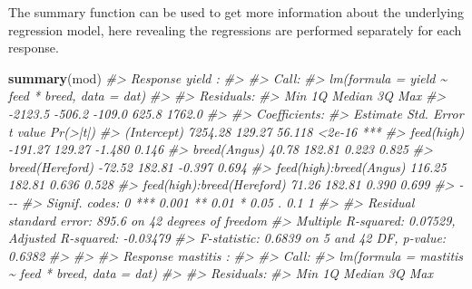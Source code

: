 \documentclass[
]{article}
\newenvironment{Shaded}{\begin{snugshade}}{\end{snugshade}}
\newcommand{\CommentTok}[1]{\textcolor[rgb]{0.56,0.35,0.01}{\textit{#1}}}
\newcommand{\FunctionTok}[1]{\textcolor[rgb]{0.13,0.29,0.53}{\textbf{#1}}}
\newcommand{\NormalTok}[1]{#1}
\begin{document}
The summary function can be used to get more information about the
underlying regression model, here revealing the regressions are
performed separately for each response.

\begin{Shaded}
\begin{Highlighting}[]
\FunctionTok{summary}\NormalTok{(mod)}
\CommentTok{\#\textgreater{} Response yield :}
\CommentTok{\#\textgreater{} }
\CommentTok{\#\textgreater{} Call:}
\CommentTok{\#\textgreater{} lm(formula = yield \textasciitilde{} feed * breed, data = dat)}
\CommentTok{\#\textgreater{} }
\CommentTok{\#\textgreater{} Residuals:}
\CommentTok{\#\textgreater{}     Min      1Q  Median      3Q     Max }
\CommentTok{\#\textgreater{} {-}2123.5  {-}506.2  {-}109.0   625.8  1762.0 }
\CommentTok{\#\textgreater{} }
\CommentTok{\#\textgreater{} Coefficients:}
\CommentTok{\#\textgreater{}                            Estimate Std. Error t value Pr(\textgreater{}|t|)    }
\CommentTok{\#\textgreater{} (Intercept)                 7254.28     129.27  56.118   \textless{}2e{-}16 ***}
\CommentTok{\#\textgreater{} feed(high)                  {-}191.27     129.27  {-}1.480    0.146    }
\CommentTok{\#\textgreater{} breed(Angus)                  40.78     182.81   0.223    0.825    }
\CommentTok{\#\textgreater{} breed(Hereford)              {-}72.52     182.81  {-}0.397    0.694    }
\CommentTok{\#\textgreater{} feed(high):breed(Angus)      116.25     182.81   0.636    0.528    }
\CommentTok{\#\textgreater{} feed(high):breed(Hereford)    71.26     182.81   0.390    0.699    }
\CommentTok{\#\textgreater{} {-}{-}{-}}
\CommentTok{\#\textgreater{} Signif. codes:  0 \textquotesingle{}***\textquotesingle{} 0.001 \textquotesingle{}**\textquotesingle{} 0.01 \textquotesingle{}*\textquotesingle{} 0.05 \textquotesingle{}.\textquotesingle{} 0.1 \textquotesingle{} \textquotesingle{} 1}
\CommentTok{\#\textgreater{} }
\CommentTok{\#\textgreater{} Residual standard error: 895.6 on 42 degrees of freedom}
\CommentTok{\#\textgreater{} Multiple R{-}squared:  0.07529,    Adjusted R{-}squared:  {-}0.03479 }
\CommentTok{\#\textgreater{} F{-}statistic: 0.6839 on 5 and 42 DF,  p{-}value: 0.6382}
\CommentTok{\#\textgreater{} }
\CommentTok{\#\textgreater{} }
\CommentTok{\#\textgreater{} Response mastitis :}
\CommentTok{\#\textgreater{} }
\CommentTok{\#\textgreater{} Call:}
\CommentTok{\#\textgreater{} lm(formula = mastitis \textasciitilde{} feed * breed, data = dat)}
\CommentTok{\#\textgreater{} }
\CommentTok{\#\textgreater{} Residuals:}
\CommentTok{\#\textgreater{}      Min       1Q   Median       3Q      Max }

\end{Highlighting}
\end{Shaded}
\end{document}
